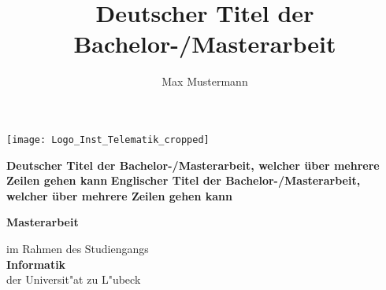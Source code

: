 

\newcommand{\titlepageskip}{\vskip 20pt}

\begin{titlepage}

\title{Deutscher Titel der Bachelor-/Masterarbeit}
\author{Max Mustermann}

{\Large
	\texttt{[image: Logo\_Inst\_Telematik\_cropped]}
	\vskip 44pt


	\textbf{\LARGE Deutscher Titel der Bachelor-/Masterarbeit, welcher über mehrere Zeilen gehen kann}
	\textbf{\LARGE Englischer Titel der Bachelor-/Masterarbeit, welcher über mehrere Zeilen gehen kann}

	\titlepageskip
	\textbf{Masterarbeit}

	\titlepageskip
	im Rahmen des Studiengangs\\
	\textbf{Informatik}\\
	der Universit"at zu L"ubeck

}
\end{titlepage}
